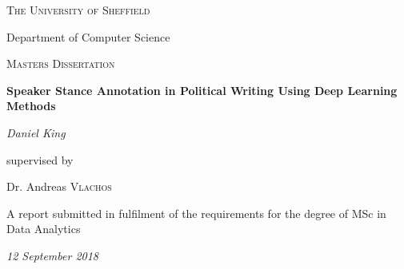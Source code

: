 \documentclass[a4paper,12pt,titlepage,openright]{report}
\begin{document}
\begin{titlepage}
	\centering
	\thisfancypage{%
	\setlength{\fboxsep}{10pt}\doublebox}{}
	\vspace*{1cm}
	{\scshape\LARGE The University of Sheffield \par}
	\large Department of Computer Science \par
	\vspace{1cm}
	{\scshape\Large Masters Dissertation\par}
	\vspace{1.5cm}
	{\huge\bfseries Speaker Stance Annotation in Political Writing Using Deep Learning Methods\par}
	\vspace{2cm}
	{\Large\itshape Daniel King\par}
	\vfill
	supervised by\par
	Dr. Andreas \textsc{Vlachos}

\vfill
\parbox{12cm}{\centering\large{A report submitted in fulfilment of the requirements for the degree of MSc in Data Analytics}}
\vfill
{\large \itshape 12 September 2018}

\	
\end{titlepage}
\end{document}
